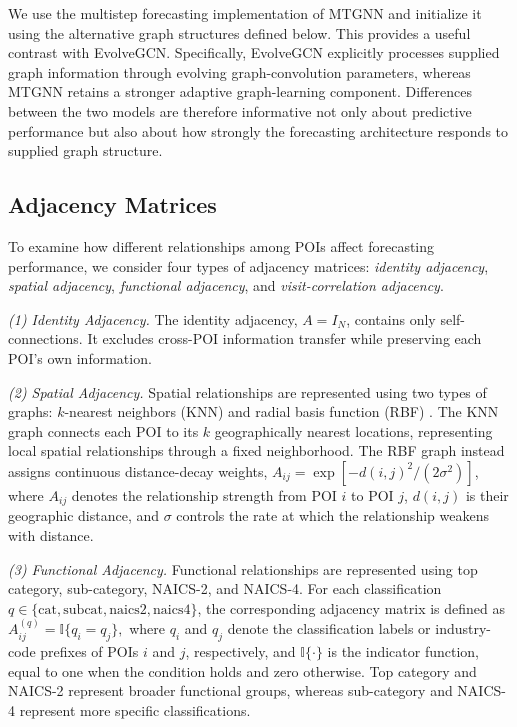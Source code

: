 \documentclass[preprint,authoryear,11pt]{elsarticle}
\def\citep#1{}%
\theoremstyle{definition}
\begin{document}
We use the multistep forecasting implementation of MTGNN and initialize it using the alternative graph structures defined below.
This provides a useful contrast with EvolveGCN.
Specifically, EvolveGCN explicitly processes supplied graph information through evolving graph-convolution parameters, whereas MTGNN retains a stronger adaptive graph-learning component.
Differences between the two models are therefore informative not only about predictive performance but also about how strongly the forecasting architecture responds to supplied graph structure.

\subsection{Adjacency Matrices}
\label{subsec:adjacency}

To examine how different relationships among POIs affect forecasting performance, we consider four types of adjacency matrices: \textit{identity adjacency}, \textit{spatial adjacency}, \textit{functional adjacency}, and \textit{visit-correlation adjacency}.

\textit{(1) Identity Adjacency.}
The identity adjacency, \(A=I_N\), contains only self-connections.
It excludes cross-POI information transfer while preserving each POI's own information.

\textit{(2) Spatial Adjacency.}
Spatial relationships are represented using two types of graphs: \(k\)-nearest neighbors (KNN) \citep{cover1967nearest} and radial basis function (RBF) \citep{li2018diffusion}.
The KNN graph connects each POI to its \(k\) geographically nearest locations, representing local spatial relationships through a fixed neighborhood.
The RBF graph instead assigns continuous distance-decay weights,
\(A_{ij}=\exp[-d(i,j)^2/(2\sigma^2)]\),
where \(A_{ij}\) denotes the relationship strength from POI \(i\) to POI \(j\), \(d(i,j)\) is their geographic distance, and \(\sigma\) controls the rate at which the relationship weakens with distance.

\textit{(3) Functional Adjacency.}
Functional relationships are represented using top category, sub-category, NAICS-2, and NAICS-4.
For each classification \(q\in\{\mathrm{cat},\mathrm{subcat},\mathrm{naics2},\mathrm{naics4}\}\), the corresponding adjacency matrix is defined as
\(
A_{ij}^{(q)}=\mathbb{I}\{q_i=q_j\},
\)
where \(q_i\) and \(q_j\) denote the classification labels or industry-code prefixes of POIs \(i\) and \(j\), respectively, and \(\mathbb{I}\{\cdot\}\) is the indicator function, equal to one when the condition holds and zero otherwise.
Top category and NAICS-2 represent broader functional groups, whereas sub-category and NAICS-4 represent more specific classifications.
\end{document}
